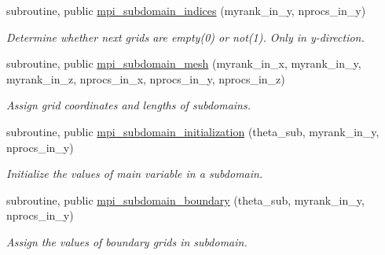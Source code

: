 \begin{DoxyCompactItemize}
subroutine, public \mbox{\hyperlink{namespacempi__subdomain_afe948dc18da021f2448cf9a6265155fe}{mpi\+\_\+subdomain\+\_\+indices}} (myrank\+\_\+in\+\_\+y, nprocs\+\_\+in\+\_\+y)
\begin{DoxyCompactList}\small\item\em Determine whether next grids are empty(0) or not(1). Only in y-\/direction. \end{DoxyCompactList}\item 
subroutine, public \mbox{\hyperlink{namespacempi__subdomain_a612331eead74041f174ece9a572c7427}{mpi\+\_\+subdomain\+\_\+mesh}} (myrank\+\_\+in\+\_\+x, myrank\+\_\+in\+\_\+y, myrank\+\_\+in\+\_\+z, nprocs\+\_\+in\+\_\+x, nprocs\+\_\+in\+\_\+y, nprocs\+\_\+in\+\_\+z)
\begin{DoxyCompactList}\small\item\em Assign grid coordinates and lengths of subdomains. \end{DoxyCompactList}\item 
subroutine, public \mbox{\hyperlink{namespacempi__subdomain_a7cc0deb85b84358eb7addeea849733c4}{mpi\+\_\+subdomain\+\_\+initialization}} (theta\+\_\+sub, myrank\+\_\+in\+\_\+y, nprocs\+\_\+in\+\_\+y)
\begin{DoxyCompactList}\small\item\em Initialize the values of main variable in a subdomain. \end{DoxyCompactList}\item 
subroutine, public \mbox{\hyperlink{namespacempi__subdomain_a55659431068678c08d21847338390ea8}{mpi\+\_\+subdomain\+\_\+boundary}} (theta\+\_\+sub, myrank\+\_\+in\+\_\+y, nprocs\+\_\+in\+\_\+y)
\begin{DoxyCompactList}\small\item\em Assign the values of boundary grids in subdomain. \end{DoxyCompactList}\end{DoxyCompactItemize}
